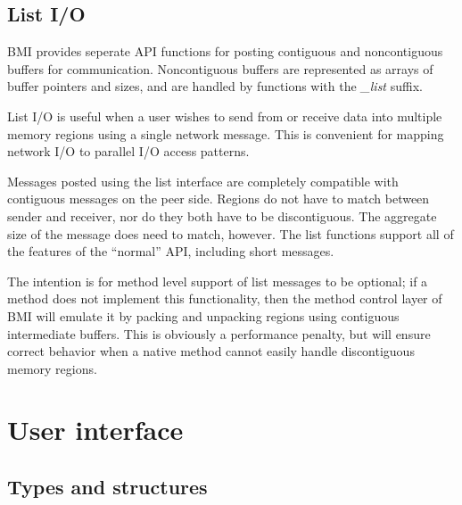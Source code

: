\documentclass[11pt]{article}
\begin{document}
\subsection{List I/O}

BMI provides seperate API functions for posting contiguous and
noncontiguous buffers for communication.   Noncontiguous buffers
are represented as arrays of buffer pointers and sizes, and are
handled by functions with the \emph{\_list} suffix.

List I/O is useful when a user wishes to send from or receive data
into multiple memory regions using a single network message.  This
is convenient for mapping network I/O to parallel I/O access patterns.

Messages posted using the list interface are completely compatible
with contiguous messages on the peer side.  Regions do not have to
match between sender and receiver, nor do they both have to be
discontiguous.  The aggregate size of the message does need to
match, however.
The list functions support all of the features of the ``normal''
API, including short messages.

The intention is for method level support of list messages to be
optional; if a method does not implement this functionality, then
the method control layer of BMI will emulate it by packing and
unpacking regions using contiguous intermediate buffers.  This is
obviously a performance penalty, but will ensure correct behavior
when a native method cannot easily handle discontiguous memory
regions.

\section{User interface}
\label{sec:user}

\subsection{Types and structures}
\end{document}
